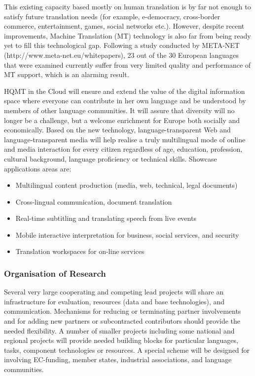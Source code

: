 \documentclass[10pt, plain]{../../metanetpaper}
\begin{document}
\begin{multicols}{2}
This existing capacity based mostly on human translation is by far not enough to satisfy future translation needs (for example, e-democracy, cross-border commerce, entertainment, games, social networks etc.). However, despite recent improvements, Machine Translation (MT) technology is also far from being ready yet to fill this technological gap. Following a study conducted by META-NET (http://www.meta-net.eu/whitepapers), 23 out of the 30 European languages that were examined currently suffer from very limited quality and performance of MT support, which is an alarming result.

HQMT in the Cloud will ensure and extend the value of the digital information space where everyone can contribute in her own language and be understood by members of other language communities. It will assure that diversity will no longer be a challenge, but a welcome enrichment for Europe both socially and economically. Based on the new technology, language-transparent Web and language-transparent media will help realise a truly multilingual mode of online and media interaction for every citizen regardless of age, education, profession, cultural background, language proficiency or technical skills. Showcase applications areas are:

\begin{itemize}
\item Multilingual content production (media, web, technical, legal documents)
\item Cross-lingual communication, document translation
\item Real-time subtitling and translating speech from live events
\item Mobile interactive interpretation for business, social services, and security
\item Translation workspaces for on-line services
\end{itemize}

\subsubsection{Organisation of Research}
\label{sec:organ-rese-pt1}

Several very large cooperating and competing lead projects will share an infrastructure for evaluation, resources (data and base technologies), and communication. Mechanisms for reducing or terminating partner involvements and for adding new partners or subcontracted contributors should provide the needed flexibility. A number of smaller projects including some national and regional projects will provide needed building blocks for particular languages, tasks, component technologies or resources.  A special scheme will be designed for involving EC-funding, member states, industrial associations, and language communities.
 

\end{multicols}
\end{document}
